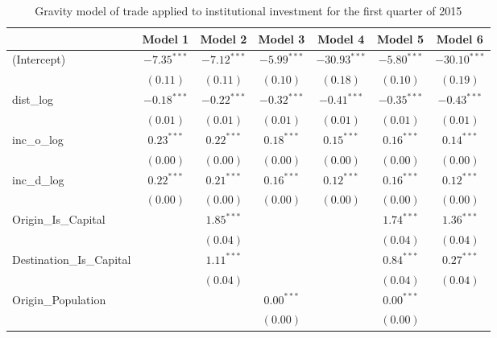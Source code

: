 \begin{table}
	\begin{center}
		\small
		\caption[Gravity Model of Trade for Q1 2015]{Gravity model of trade applied to institutional investment for the first quarter of 2015}
		\begin{tabular}{l c c c c c c }
			\hline
			& Model 1 & Model 2 & Model 3 & Model 4 & Model 5 & Model 6 \\
			\hline
			(Intercept)                  & $-7.35^{***}$ & $-7.12^{***}$ & $-5.99^{***}$ & $-30.93^{***}$ & $-5.80^{***}$ & $-30.10^{***}$ \\
			& $(0.11)$      & $(0.11)$      & $(0.10)$      & $(0.18)$       & $(0.10)$      & $(0.19)$       \\
			dist\_log                    & $-0.18^{***}$ & $-0.22^{***}$ & $-0.32^{***}$ & $-0.41^{***}$  & $-0.35^{***}$ & $-0.43^{***}$  \\
			& $(0.01)$      & $(0.01)$      & $(0.01)$      & $(0.01)$       & $(0.01)$      & $(0.01)$       \\
			inc\_o\_log                  & $0.23^{***}$  & $0.22^{***}$  & $0.18^{***}$  & $0.15^{***}$   & $0.16^{***}$  & $0.14^{***}$   \\
			& $(0.00)$      & $(0.00)$      & $(0.00)$      & $(0.00)$       & $(0.00)$      & $(0.00)$       \\
			inc\_d\_log                  & $0.22^{***}$  & $0.21^{***}$  & $0.16^{***}$  & $0.12^{***}$   & $0.16^{***}$  & $0.12^{***}$   \\
			& $(0.00)$      & $(0.00)$      & $(0.00)$      & $(0.00)$       & $(0.00)$      & $(0.00)$       \\
			Origin\_Is\_Capital          &               & $1.85^{***}$  &               &                & $1.74^{***}$  & $1.36^{***}$   \\
			&               & $(0.04)$      &               &                & $(0.04)$      & $(0.04)$       \\
			Destination\_Is\_Capital     &               & $1.11^{***}$  &               &                & $0.84^{***}$  & $0.27^{***}$   \\
			&               & $(0.04)$      &               &                & $(0.04)$      & $(0.04)$       \\
			Origin\_Population           &               &               & $0.00^{***}$  &                & $0.00^{***}$  &                \\
			&               &               & $(0.00)$      &                & $(0.00)$      &                \\

\end{tabular}
\end{center}
\end{table}
